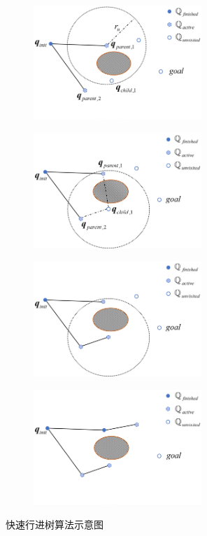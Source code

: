 \documentclass[lang=chs, degree=master, blindreview=false, winfonts=true]{yanputhesis}
\begin{document}
\begin{figure}[htb!]
	\centering
	\begin{minipage}[t]{0.96\textwidth}
		\begin{subfigure}[t]{0.47\textwidth}
			\centering
			\includegraphics[width = 2.5in]{picture/FMT1.png}
			\caption{ }
			\label{fig:FMT(1)}
		\end{subfigure}\hfill
		\begin{subfigure}[t]{0.47\textwidth}
			\centering
			\includegraphics[width = 2.5in]{picture/FMT2.png}
			\caption{ }
			\label{fig:FMT(2)}
		\end{subfigure}
		
		\vspace{10pt}
		\begin{subfigure}[t]{0.47\textwidth}
			\centering
			\includegraphics[width = 2.5in]{picture/FMT3.png}
			\caption{ }
			\label{fig:FMT(3)}
		\end{subfigure}\hfill
		\begin{subfigure}[t]{0.47\textwidth}
			\centering
			\includegraphics[width = 2.5in]{picture/FMT4.png}
			\caption{ }
			\label{fig:FMT(4)}
		\end{subfigure}
	\end{minipage}
	\caption{快速行进树算法示意图\label{Fig.fmt}}
\end{figure}
\end{document}
